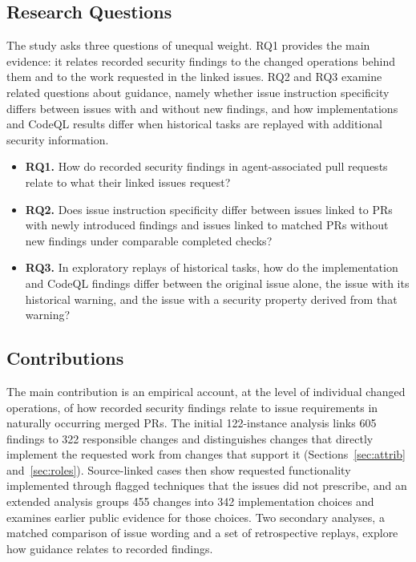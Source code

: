 \documentclass[acmsmall,screen,nonacm]{acmart}
\begin{document}
\subsection{Research Questions}\label{sec:rqs}

The study asks three questions of unequal weight. RQ1 provides the main evidence: it relates recorded security findings to the changed operations behind them and to the work requested in the linked issues. RQ2 and RQ3 examine related questions about guidance, namely whether issue instruction specificity differs between issues with and without new findings, and how implementations and CodeQL results differ when historical tasks are replayed with additional security information.
\begin{itemize}
\item \textbf{RQ1.} How do recorded security findings in agent-associated pull requests relate to what their linked issues request?
\item \textbf{RQ2.} Does issue instruction specificity differ between issues linked to PRs with newly introduced findings and issues linked to matched PRs without new findings under comparable completed checks?
\item \textbf{RQ3.} In exploratory replays of historical tasks, how do the implementation and CodeQL findings differ between the original issue alone, the issue with its historical warning, and the issue with a security property derived from that warning?
\end{itemize}

\subsection{Contributions}

The main contribution is an empirical account, at the level of individual changed operations, of how recorded security findings relate to issue requirements in naturally occurring merged PRs. The initial 122-instance analysis links 605 findings to 322 responsible changes and distinguishes changes that directly implement the requested work from changes that support it (Sections~\ref{sec:attrib} and~\ref{sec:roles}). Source-linked cases then show requested functionality implemented through flagged techniques that the issues did not prescribe, and an extended analysis groups 455 changes into 342 implementation choices and examines earlier public evidence for those choices. Two secondary analyses, a matched comparison of issue wording and a set of retrospective replays, explore how guidance relates to recorded findings.
\end{document}
